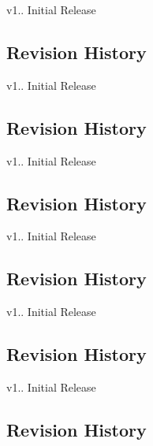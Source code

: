 \begin{DoxyItemize}
\item v1.. Initial Release
\end{DoxyItemize}\hypertarget{group___h_p_l_hpl_dma_rev}{}\subsection{Revision History}\label{group___h_p_l_hpl_dma_rev}

\begin{DoxyItemize}
\item v1.. Initial Release
\end{DoxyItemize}\hypertarget{group___h_p_l_hpl_port_rev}{}\subsection{Revision History}\label{group___h_p_l_hpl_port_rev}

\begin{DoxyItemize}
\item v1.. Initial Release
\end{DoxyItemize}\hypertarget{group___h_p_l_hpl_init_rev}{}\subsection{Revision History}\label{group___h_p_l_hpl_init_rev}

\begin{DoxyItemize}
\item v1.. Initial Release
\end{DoxyItemize}\hypertarget{group___h_p_l_hpl_irq_rev}{}\subsection{Revision History}\label{group___h_p_l_hpl_irq_rev}

\begin{DoxyItemize}
\item v1.. Initial Release
\end{DoxyItemize}\hypertarget{group___h_p_l_hpl_pwm_rev}{}\subsection{Revision History}\label{group___h_p_l_hpl_pwm_rev}

\begin{DoxyItemize}
\item v1.. Initial Release
\end{DoxyItemize}\hypertarget{group___h_p_l_hpl_reset_rev}{}\subsection{Revision History}\label{group___h_p_l_hpl_reset_rev}

